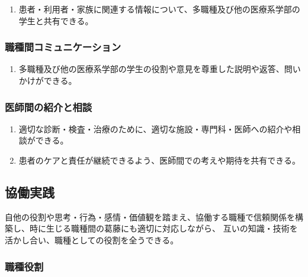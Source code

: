 \begin{enumerate}
\def\labelenumi{\arabic{enumi}.}
\tightlist
\item
  患者・利用者・家族に関連する情報について、多職種及び他の医療系学部の学生と共有できる。
\end{enumerate}

\hypertarget{ux8077ux7a2eux9593ux30b3ux30dfux30e5ux30cbux30b1ux30fcux30b7ux30e7ux30f3}{%
\subsubsection{職種間コミュニケーション}\label{ux8077ux7a2eux9593ux30b3ux30dfux30e5ux30cbux30b1ux30fcux30b7ux30e7ux30f3}}

\begin{enumerate}
\def\labelenumi{\arabic{enumi}.}
\tightlist
\item
  多職種及び他の医療系学部の学生の役割や意見を尊重した説明や返答、問いかけができる。
\end{enumerate}

\hypertarget{ux533bux5e2bux9593ux306eux7d39ux4ecbux3068ux76f8ux8ac7}{%
\subsubsection{医師間の紹介と相談}\label{ux533bux5e2bux9593ux306eux7d39ux4ecbux3068ux76f8ux8ac7}}

\begin{enumerate}
\def\labelenumi{\arabic{enumi}.}
\tightlist
\item
  適切な診断・検査・治療のために、適切な施設・専門科・医師への紹介や相談ができる。
\item
  患者のケアと責任が継続できるよう、医師間での考えや期待を共有できる。
\end{enumerate}

\hypertarget{ux5354ux50cdux5b9fux8df5}{%
\subsection{協働実践}\label{ux5354ux50cdux5b9fux8df5}}

自他の役割や思考・行為・感情・価値観を踏まえ、協働する職種で信頼関係を構築し、時に生じる職種間の葛藤にも適切に対応しながら、
互いの知識・技術を活かし合い、職種としての役割を全うできる。

\hypertarget{ux8077ux7a2eux5f79ux5272}{%
\subsubsection{職種役割}\label{ux8077ux7a2eux5f79ux5272}}

